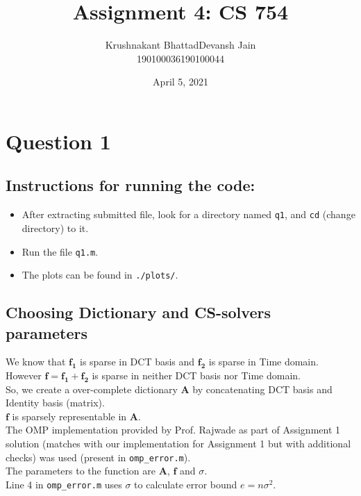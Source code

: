 \documentclass[fleqn, 11pt]{article}
\title{Assignment 4: CS 754}
\author{ 
\begin{tabular}{|c|c|}
     \hline
     \textsf{Krushnakant Bhattad} & \textsf{Devansh Jain} \\
     \hline
     \textsf{190100036} & \textsf{190100044}\\
     \hline
\end{tabular}
}
\date{April 5, 2021}
\newcommand{\bs}[1]{\boldsymbol{#1}}
\begin{document}
\maketitle
\tableofcontents
\thispagestyle{empty}
\setcounter{page}{0}

\newpage
\section*{Question 1}
\setcounter{equation}{0}

\subsection*{Instructions for running the code:}
\begin{itemize}[noitemsep]
    \item After extracting submitted file, look for a directory named \texttt{q1}, and \texttt{cd} (change directory) to it.
    \item Run the file \texttt{q1.m}.
    \item The plots can be found in \texttt{./plots/}.
\end{itemize}

\bigskip

\subsection*{Choosing Dictionary and CS-solvers parameters}
We know that $\bs{f_1}$ is sparse in DCT basis and $\bs{f_2}$ is sparse in Time domain. \\
However $\bs{f} = \bs{f_1} + \bs{f_2}$ is sparse in neither DCT basis nor Time domain. \\
So, we create a over-complete dictionary $\bs{A}$ by concatenating DCT basis and Identity basis (matrix). \\
$\bs{f}$ is sparsely representable in $\bs{A}$.\\

The OMP implementation provided by Prof. Rajwade as part of Assignment 1 solution (matches with our implementation for Assignment 1 but with additional checks) was used (present in \texttt{omp\_error.m}). \\
The parameters to the function are $\bs{A}$, $\bs{f}$ and $\sigma$. \\
Line 4 in \texttt{omp\_error.m} uses $\sigma$ to calculate error bound $e = n \sigma^2$. \\
\end{document}
